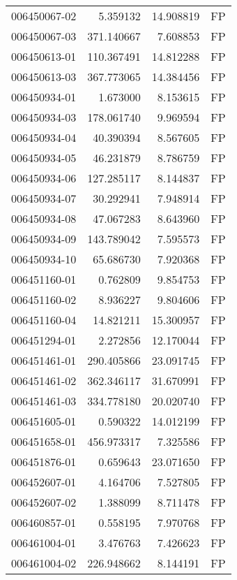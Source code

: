 \begin{tabular}{lrrl}
006450067-02 &    5.359132 &      14.908819 &   FP \\
006450067-03 &  371.140667 &       7.608853 &   FP \\
006450613-01 &  110.367491 &      14.812288 &   FP \\
006450613-03 &  367.773065 &      14.384456 &   FP \\
006450934-01 &    1.673000 &       8.153615 &   FP \\
006450934-03 &  178.061740 &       9.969594 &   FP \\
006450934-04 &   40.390394 &       8.567605 &   FP \\
006450934-05 &   46.231879 &       8.786759 &   FP \\
006450934-06 &  127.285117 &       8.144837 &   FP \\
006450934-07 &   30.292941 &       7.948914 &   FP \\
006450934-08 &   47.067283 &       8.643960 &   FP \\
006450934-09 &  143.789042 &       7.595573 &   FP \\
006450934-10 &   65.686730 &       7.920368 &   FP \\
006451160-01 &    0.762809 &       9.854753 &   FP \\
006451160-02 &    8.936227 &       9.804606 &   FP \\
006451160-04 &   14.821211 &      15.300957 &   FP \\
006451294-01 &    2.272856 &      12.170044 &   FP \\
006451461-01 &  290.405866 &      23.091745 &   FP \\
006451461-02 &  362.346117 &      31.670991 &   FP \\
006451461-03 &  334.778180 &      20.020740 &   FP \\
006451605-01 &    0.590322 &      14.012199 &   FP \\
006451658-01 &  456.973317 &       7.325586 &   FP \\
006451876-01 &    0.659643 &      23.071650 &   FP \\
006452607-01 &    4.164706 &       7.527805 &   FP \\
006452607-02 &    1.388099 &       8.711478 &   FP \\
006460857-01 &    0.558195 &       7.970768 &   FP \\
006461004-01 &    3.476763 &       7.426623 &   FP \\
006461004-02 &  226.948662 &       8.144191 &   FP \\

\end{tabular}
